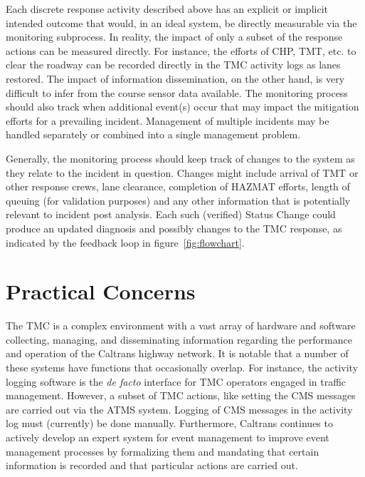 \documentclass[12pt]{report}
\begin{document}
Each discrete response activity described above has an explicit or implicit
intended outcome that would, in an ideal system, be directly measurable via the
monitoring subprocess.  In reality, the impact of only a subset of the response
actions can be measured directly.  For instance, the efforts of CHP, TMT,
etc. to clear the roadway can be recorded directly in the TMC activity logs as
lanes restored.  The impact of information dissemination, on the other hand, is
very difficult to infer from the course sensor data available.  The monitoring
process should also track when additional event(s) occur that may impact the
mitigation efforts for a prevailing incident.  Management of multiple incidents
may be handled separately or combined into a single management problem.

Generally, the monitoring process should keep track of changes to the system as
they relate to the incident in question.  Changes might include arrival of TMT
or other response crews, lane clearance, completion of HAZMAT efforts, length of
queuing (for validation purposes) and any other information that is potentially
relevant to incident post analysis.  Each such (verified) {\sc Status Change}
could produce an updated diagnosis and possibly changes to the TMC response, as
indicated by the feedback loop in figure~\ref{fig:flowchart}.


\section{Practical Concerns}
\label{sec:practical-concerns}

The TMC is a complex environment with a vast array of hardware and software
collecting, managing, and disseminating information regarding the performance
and operation of the Caltrans highway network.  It is notable that a number of
these systems have functions that occasionally overlap.  For instance, the
activity logging software is the \emph{de facto} interface for TMC operators
engaged in traffic management.  However, a subset of TMC actions, like setting
the CMS messages are carried out via the ATMS system.  Logging of CMS messages
in the activity log must (currently) be done manually.  Furthermore, Caltrans
continues to actively develop an expert system for event management to improve
event management processes by formalizing them and mandating that certain
information is recorded and that particular actions are carried out.
\end{document}
